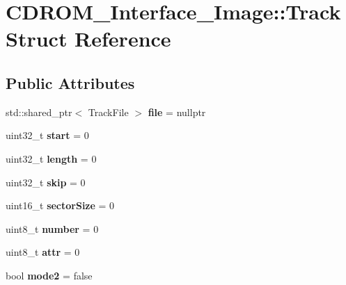 \hypertarget{structCDROM__Interface__Image_1_1Track}{\section{C\-D\-R\-O\-M\-\_\-\-Interface\-\_\-\-Image\-:\-:Track Struct Reference}
\label{structCDROM__Interface__Image_1_1Track}
}
\subsection*{Public Attributes}
\begin{DoxyCompactItemize}
\item 
\hypertarget{structCDROM__Interface__Image_1_1Track_a780d95e771904cd56d4d4761b8e8af25}{std\-::shared\-\_\-ptr$<$ Track\-File $>$ {\bfseries file} = nullptr}\label{structCDROM__Interface__Image_1_1Track_a780d95e771904cd56d4d4761b8e8af25}

\item 
\hypertarget{structCDROM__Interface__Image_1_1Track_a8c89cad6f6e925b87526bc2cc2e5b85c}{uint32\-\_\-t {\bfseries start} = 0}\label{structCDROM__Interface__Image_1_1Track_a8c89cad6f6e925b87526bc2cc2e5b85c}

\item 
\hypertarget{structCDROM__Interface__Image_1_1Track_a73c1ca7c22324f247b2039e7da119f7a}{uint32\-\_\-t {\bfseries length} = 0}\label{structCDROM__Interface__Image_1_1Track_a73c1ca7c22324f247b2039e7da119f7a}

\item 
\hypertarget{structCDROM__Interface__Image_1_1Track_a4ebc1a3af4e6d91d76157a8197d547ed}{uint32\-\_\-t {\bfseries skip} = 0}\label{structCDROM__Interface__Image_1_1Track_a4ebc1a3af4e6d91d76157a8197d547ed}

\item 
\hypertarget{structCDROM__Interface__Image_1_1Track_a431a584b319507d71dd2aa50a2a0ad01}{uint16\-\_\-t {\bfseries sector\-Size} = 0}\label{structCDROM__Interface__Image_1_1Track_a431a584b319507d71dd2aa50a2a0ad01}

\item 
\hypertarget{structCDROM__Interface__Image_1_1Track_aba51f3e053431aee6341688feb768af1}{uint8\-\_\-t {\bfseries number} = 0}\label{structCDROM__Interface__Image_1_1Track_aba51f3e053431aee6341688feb768af1}

\item 
\hypertarget{structCDROM__Interface__Image_1_1Track_a220462a699b1f8a412bca286f11e0437}{uint8\-\_\-t {\bfseries attr} = 0}\label{structCDROM__Interface__Image_1_1Track_a220462a699b1f8a412bca286f11e0437}

\item 
\hypertarget{structCDROM__Interface__Image_1_1Track_a01478b06534faf52252784921cc64759}{bool {\bfseries mode2} = false}\label{structCDROM__Interface__Image_1_1Track_a01478b06534faf52252784921cc64759}

\end{DoxyCompactItemize}


